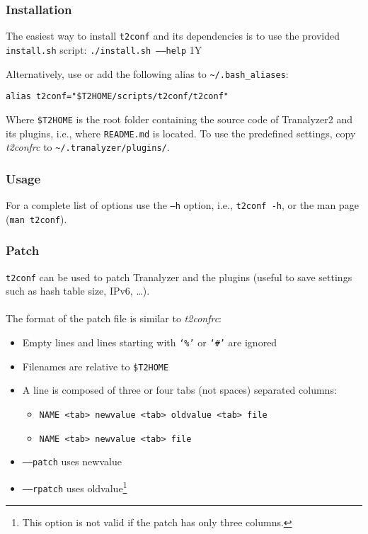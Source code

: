 \documentclass[documentation]{subfiles}
\begin{document}
\subsubsection{Installation}\label{t2confinstall}
The easiest way to install {\tt t2conf} and its dependencies is to use the provided {\tt install.sh} script: {\tt ./install.sh --{}--help}
1Y%
%
%

Alternatively, use  or add the following alias to {\tt \textasciitilde{}/.bash\_aliases}:
\begin{center}
    {\tt alias t2conf="\$T2HOME/scripts/t2conf/t2conf"}
\end{center}
Where {\tt \$T2HOME} is the root folder containing the source code of Tranalyzer2 and its plugins, i.e., where {\tt README.md} is located.
To use the predefined settings, copy {\em t2confrc} to {\tt\textasciitilde{}/.tranalyzer/plugins/}.
\subsubsection{Usage}
For a complete list of options use the {\tt --h} option, i.e., {\tt t2conf -h}, or the man page ({\tt man t2conf}).
\subsubsection{Patch}\label{t2confpatch}
{\tt t2conf} can be used to patch Tranalyzer and the plugins (useful to save settings such as hash table size, IPv6, \ldots).\\\\
The format of the patch file is similar to {\em t2confrc}:
\begin{itemize}
    \item Empty lines and lines starting with {\tt `\%'} or {\tt `\#'} are ignored
    \item Filenames are relative to {\tt \$T2HOME}
    \item A line is composed of three or four tabs (not spaces) separated columns:
        \begin{itemize}
            \item {\tt NAME <tab> newvalue <tab> oldvalue <tab> file}
            \item {\tt NAME <tab> newvalue <tab> file}
        \end{itemize}
    \item {\tt --{}--patch} uses newvalue
    \item {\tt --{}--rpatch} uses oldvalue\footnote{This option is not valid if the patch has only three columns.}
\end{itemize}
\end{document}

